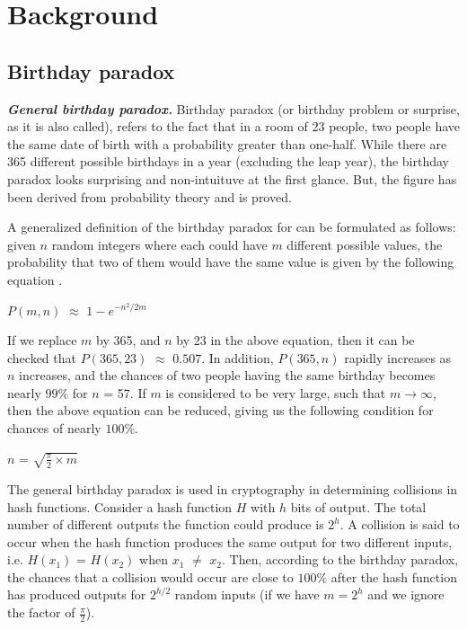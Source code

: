 \section{Background}
\subsection{Birthday paradox}
\label{sec:bday-paradox}

\textit{\textbf{General birthday paradox.}} Birthday paradox (or birthday problem or surprise, as it is also called), refers to the fact that in a room of 23 people, two people have the same date of birth with a probability greater than one-half. While there are 365 different possible birthdays in a year (excluding the leap year), the birthday paradox looks surprising and non-intuituve at the first glance. But, the figure has been derived from probability theory and is proved. 

A generalized definition of the birthday paradox for can be formulated as follows: given $n$ random integers where each could have $m$ different possible values, the probability that two of them would have the same value is given by the following equation \cite{menezes}.

\begin{center}
\large{$P(m,n)$ $\approx$ $1 - e^{-{n^2}/{2m}}$}
\end{center}

If we replace $m$ by 365, and $n$ by 23 in the above equation, then it can be checked that $P(365,23)$ $\approx$ $0.507$. In addition, $P(365,n)$ rapidly increases as $n$ increases, and the chances of two people having the same birthday becomes nearly $99 \%$ for $n$ = 57. If $m$ is considered to be very large, such that $m \rightarrow \infty$, then the above equation can be reduced, giving us the following condition for chances of nearly $100 \%$. 

\begin{center}
\large{$n$ = $\sqrt{\frac{\pi}{2} \times m}$}
\end{center}

The general birthday paradox is used in cryptography in determining collisions in hash functions. Consider a hash function $H$ with $h$ bits of output. The total number of different outputs the function could produce is $2^{h}$. A collision is said to occur when the hash function produces the same output for two different inputs, i.e. $H(x_1)$ = $H(x_2)$ when $x_1$ $\neq$ $x_2$. Then, according to the birthday paradox, the chances that a collision would occur are close to $100 \%$ after the hash function has produced outputs for $2^{h/2}$ random inputs (if we have $m = 2^h$ and we ignore the factor of $\frac{\pi}{2}$).\\

